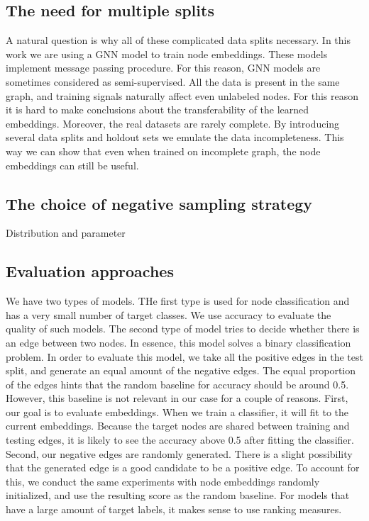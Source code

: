 \documentclass[a4paper,twoside]{article}
\begin{document}
\subsection{The need for multiple splits}

A natural question is why all of these complicated data splits necessary. In this work we are using a GNN model to train node embeddings. These models implement message passing procedure. For this reason, GNN models are sometimes considered as semi-supervised. All the data is present in the same graph, and training signals naturally affect even unlabeled nodes. For this reason it is hard to make conclusions about the transferability of the learned embeddings. Moreover, the real datasets are rarely complete. By introducing several data splits and holdout sets we emulate the data incompleteness. This way we can show that even when trained on incomplete graph, the node embeddings can still be useful.

\subsection{The choice of negative sampling strategy}

Distribution and parameter

\subsection{Evaluation approaches}

We have two types of models. THe first type is used for node classification and has a very small number of target classes. We use accuracy to evaluate the quality of such models. The second type of model tries to decide whether there is an edge between two nodes. In essence, this model solves a binary classification problem. In order to evaluate this model, we take all the positive edges in the test split, and generate an equal amount of the negative edges. The equal proportion of the edges hints that the random baseline for accuracy should be around 0.5. However, this baseline is not relevant in our case for a couple of reasons. First, our goal is to evaluate embeddings. When we train a classifier, it will fit to the current embeddings. Because the target nodes are shared between training and testing edges, it is likely to see the accuracy above 0.5 after fitting the classifier. Second, our negative edges are randomly generated. There is a slight possibility that the generated edge is a good candidate to be a positive edge. To account for this, we conduct the same experiments with node embeddings randomly initialized, and use the resulting score as the random baseline.
For models that have a large amount of target labels, it makes sense to use ranking measures.  
\end{document}
